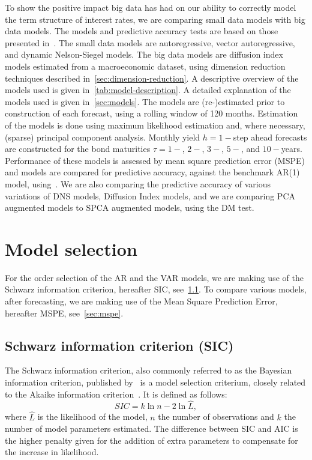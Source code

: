 To show the positive impact big data has had on our ability to correctly model the term structure of interest rates, we are comparing small data models with big data models. 
The models and predictive accuracy tests are based on those presented in~\textcite{swanson_big_2017}. 
The small data models are autoregressive, vector autoregressive, and dynamic Nelson-Siegel models. 
The big data models are diffusion index models estimated from a macroeconomic dataset, using dimension reduction techniques described in~\cref{sec:dimension-reduction}. 
A descriptive overview of the models used is given in~\cref{tab:model-description}.
A detailed explanation of the models used is given in~\cref{sec:models}.
The models are (re-)estimated prior to construction of each forecast, using a rolling window of 120 months.
Estimation of the models is done using maximum likelihood estimation and, where necessary, (sparse) principal component analysis. 
Monthly yield $h = 1-$step ahead forecasts are constructed for the bond maturities $\tau = 1-$, $2-$, $3-$, $5-$, and $10-$years. 
Performance of these models is assessed by mean square prediction error (MSPE) and models are compared for predictive accuracy, against the benchmark AR(1) model, using~\textcite[hereafter DM]{diebold_comparing_1994}. 
We are also comparing the predictive accuracy of various variations of DNS models, Diffusion Index models, and we are comparing PCA augmented models to SPCA augmented models, using the DM test. 

\section{Model selection}
For the order selection of the AR and the VAR models, we are making use of the Schwarz information criterion, hereafter SIC, see~\cref{sec:sic}. 
To compare various models, after forecasting, we are making use of the Mean Square Prediction Error, hereafter MSPE, see~\cref{sec:mspe}.

\subsection{Schwarz information criterion (SIC)}
\label{sec:sic}
The Schwarz information criterion, also commonly referred to as the Bayesian information criterion, published by~\textcite[hereafter SIC]{schwarz_estimating_1978} is a model selection criterium, closely related to the Akaike information criterion~\parencite{akaike_new_1974}. 
It is defined as follows:
\begin{equation}
	SIC = k\ln{n} - 2\ln{\hat{L}},
\end{equation}
where $\hat{L}$ is the likelihood of the model, $n$ the number of observations and $k$ the number of model parameters estimated. The difference between SIC and AIC is the higher penalty given for the addition of extra parameters to compensate for the increase in likelihood.

